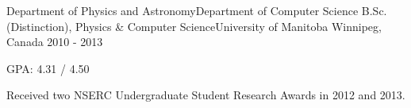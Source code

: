 \begin{cventries}
  \cventry
    {Department of Physics and Astronomy{\awesomesep}Department of Computer Science} %
    {B.Sc. (Distinction), Physics \& Computer Science{\awesomesep}University of Manitoba} %
    {Winnipeg, Canada} %
    {2010 - 2013} %
    {
      \begin{cvitems} %
        \item {GPA: 4.31 / 4.50}
        \item {Received two NSERC Undergraduate Student Research Awards in 2012 and 2013.}
      \end{cvitems}
    }


\end{cventries}
